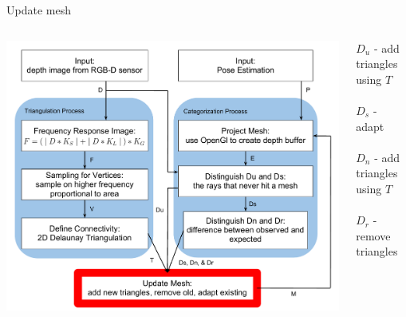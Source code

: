 \documentclass{beamer}
\begin{document}
\begin{frame}{Update mesh}
\vspace{-.2in}
\begin{columns}
  \begin{center}
  \includegraphics[width=\textwidth]{SDupdate.pdf} 
  \end{center}
$D_u$ - add triangles using $T$ \\
~\\
$D_s$ - adapt \\
~\\
$D_n$ - add triangles using $T$ \\
~\\
$D_r$ - remove triangles
\end{columns}
\end{frame}
\end{document}
